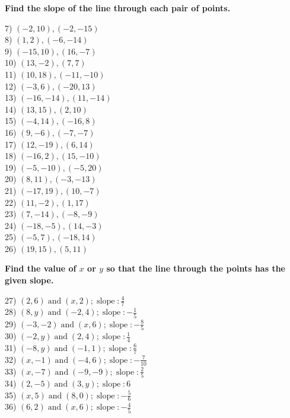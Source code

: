 \documentclass[12pt]{book}
\theoremstyle{definition}
\newcommand{\tmop}[1]{\ensuremath{\operatorname{#1}}}
\begin{document}
{\bf Find the slope of the line through each pair of points.}
\begin{multicols}{3}
  7) $(- 2, 10), (- 2, - 15)$\\
  8) $(1, 2), (- 6, - 14)$\\
  9) $(- 15, 10), (16, - 7)$\\
  10) $(13, - 2), (7, 7)$\\
  11) $(10, 18), (- 11, - 10)$\\
  12) $(- 3, 6), (- 20, 13)$\\
  13) $(- 16, - 14), (11, - 14)$\\
  14) $(13, 15), (2, 10)$\\
  15) $(- 4, 14), (- 16, 8)$\\
  16) $(9, - 6), (- 7, - 7)$\\
  17) $(12, - 19), (6, 14)$\\
  18) $(- 16, 2), (15, - 10)$\\
  19) $(- 5, - 10), (- 5, 20)$\\
  20) $(8, 11), (- 3, - 13)$\\
  21) $(- 17, 19), (10, - 7)$\\
  22) $(11, - 2), (1, 17)$\\
  23) $(7, - 14), (- 8, - 9)$\\
  24) $(- 18, - 5), (14, - 3)$\\
  25) $(- 5, 7), (- 18, 14)$\\
  26) $(19, 15), (5, 11)$
\end{multicols}
{\bf Find the value of $x$ or $y$ so that the line through the points has
the given slope.}
\begin{multicols}{2}
  27) $(2, 6) \tmop{and} (x, 2) ; \tmop{slope} : \frac{4}{7}$\\
  28) $(8, y) \tmop{and} (- 2, 4) ; \tmop{slope} : - \frac{1}{5}$\\
  29) $(- 3, - 2) \tmop{and} (x, 6) ; \tmop{slope} : - \frac{8}{5}$\\
  30) $(- 2, y) \tmop{and} (2, 4) ; \tmop{slope} : \frac{1}{4}$\\
  31) $(- 8, y) \tmop{and} (- 1, 1) ; \tmop{slope} : \frac{6}{7}$\\
  32) $(x, - 1) \tmop{and} (- 4, 6) ; \tmop{slope} : - \frac{7}{10}$\\
  33) $(x, - 7) \tmop{and} (- 9, - 9) ; \tmop{slope} : \frac{2}{5}$\\
  34) $(2, - 5) \tmop{and} (3, y) ; \tmop{slope} : 6$\\
  35) $(x, 5) \tmop{and} (8, 0) ; \tmop{slope} : - \frac{5}{6}$\\
  36) $(6, 2) \tmop{and} (x, 6) ; \tmop{slope} : - \frac{4}{5}$
\end{multicols}
\end{document}
